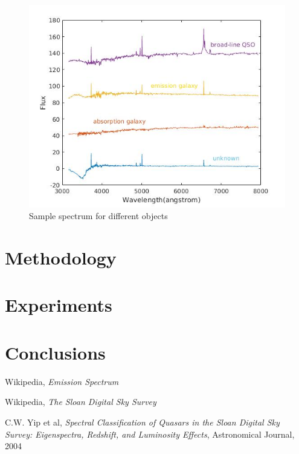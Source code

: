 \documentclass[a4paper,10pt]{article}
\begin{document}
    \begin{figure}[!ht]
      \caption{Sample spectrum for different objects}
      \centering
      \includegraphics[scale=0.6]{sample_spec.jpg}
    \end{figure}
    

\newpage

\section{Methodology}

\section{Experiments}

\section{Conclusions}

\begin{thebibliography}{9}
    Wikipedia,
    \emph{Emission Spectrum}
    
    Wikipedia,
    \emph{The Sloan Digital Sky Survey}
    
    C.W. Yip et al,
    \emph{Spectral Classification of Quasars in the Sloan Digital Sky Survey: Eigenspectra, Redshift, and Luminosity Effects},
    Astronomical Journal,
    2004
\end{thebibliography}
\end{document}

